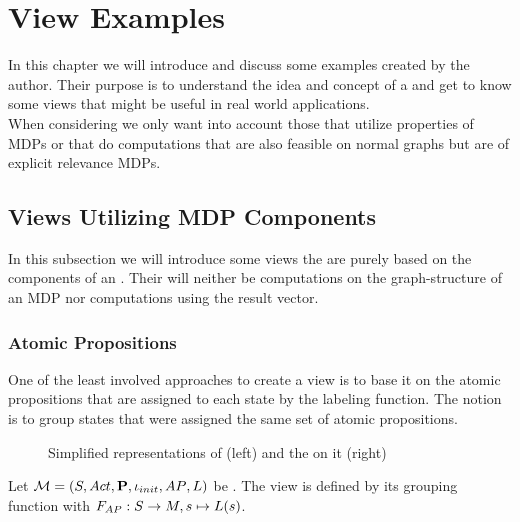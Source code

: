 \documentclass[preview]{standalone}
\begin{document}
\section{View Examples}
In this chapter we will introduce and discuss some \viewN examples created by the author. Their purpose is to understand the idea and concept of a \viewN and get to know some views that might be useful in real world applications. \\
When considering \viewsN we only want into account those that utilize properties of MDPs or that do computations that are also feasible on normal graphs but are of explicit relevance MDPs.
\subsection{Views Utilizing MDP Components}
In this subsection we will introduce some views the are purely based on the components of an \mdpN. Their will neither be computations on the graph-structure of an MDP nor computations using the result vector.
\subsubsection{Atomic Propositions}
One of the least involved approaches to create a view is to base it on the atomic propositions that are assigned to each state by the labeling function. The notion is to group states that were assigned the same set of atomic propositions. 


\begin{figure}[h]
	\begin{minipage}{.6\textwidth}
		
	\end{minipage}%
	\begin{minipage}{.5\textwidth}
		
	\end{minipage}
	\caption{Simplified representations of \mdp (left) and the \viewN \viewatomicprops on it (right)}
	\label{fig:apHasBeforeAfter}  
\end{figure}


\begin{definition}	
	Let ${{{\mathcal{M}}}} = {{({S}, {Act}, {\textbf{P}}, {\iota_{init}}, {AP}, {L})}}$ be \achgphN. The view \viewatomicprops is defined by its grouping function \gfctatomicprops \grpfctN with $\gfctatomicprops : \states \to \imggrp, {\state}\mapsto{\labelingfct(\state)}$.
\end{definition}
\end{document}
